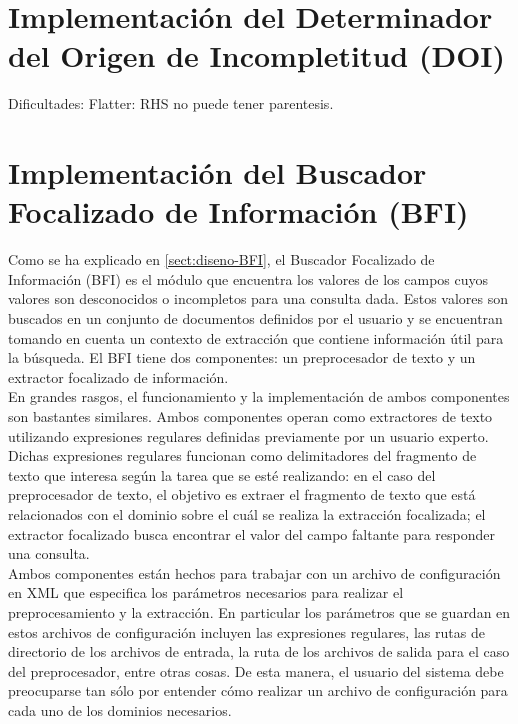 \section{Implementación del Determinador del Origen de Incompletitud (DOI)}\label{sect:implementacion-DOI}

Dificultades: Flatter: RHS no puede tener parentesis.

\section{Implementación del Buscador Focalizado de Información (BFI)}\label{sect:implementacion-BFI}

Como se ha explicado en \ref{sect:diseno-BFI}, el Buscador Focalizado de Información (BFI) es el módulo que encuentra los valores de los campos cuyos valores son desconocidos o incompletos para una consulta dada. Estos valores son buscados en un conjunto de documentos definidos por el usuario y se encuentran tomando en cuenta un contexto de extracción que contiene información útil para la búsqueda. El BFI tiene dos componentes: un preprocesador de texto y un extractor focalizado de información. \\

En grandes rasgos, el funcionamiento y la implementación de ambos componentes son bastantes similares. Ambos componentes operan como extractores de texto utilizando expresiones regulares definidas previamente por un usuario experto. Dichas expresiones regulares funcionan como delimitadores del fragmento de texto que interesa según la tarea que se esté realizando: en el caso del preprocesador de texto, el objetivo es extraer el fragmento de texto que está relacionados con el dominio sobre el cuál se realiza la extracción focalizada; el extractor focalizado busca encontrar el valor del campo faltante para responder una consulta. \\

Ambos componentes están hechos para trabajar con un archivo de configuración en XML que especifica los parámetros necesarios para realizar el preprocesamiento y la extracción. En particular los parámetros que se guardan en estos archivos de configuración incluyen las expresiones regulares, las rutas de directorio de los archivos de entrada, la ruta de los archivos de salida para el caso del preprocesador, entre otras cosas. De esta manera, el usuario del sistema debe preocuparse tan sólo por entender cómo realizar un archivo de configuración para cada uno de los dominios necesarios. \\

